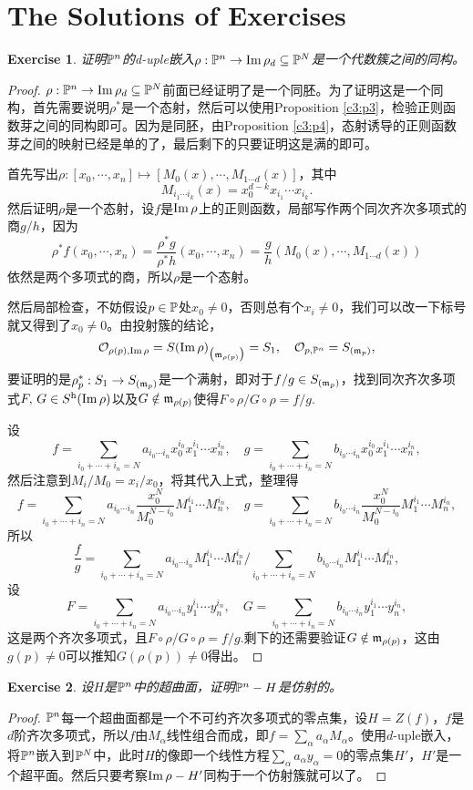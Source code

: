 \documentclass[9pt]{extarticle}
\theoremstyle{plain}%
\newtheorem{exe}{Exercise}[section]%
\begin{document}
\section*{The Solutions of Exercises}
\setcounter{exe}{3}
\begin{exe}
	证明$\mathbb{P}^n$的d-uple嵌入$\rho:\mathbb{P}^n\to \operatorname{Im} \rho_d\subseteq \mathbb{P}^N$是一个代数簇之间的同构。
\end{exe}
\begin{proof}
	$\rho:\mathbb{P}^n\to \operatorname{Im} \rho_d\subseteq \mathbb{P}^N$前面已经证明了是一个同胚。为了证明这是一个同构，首先需要说明$\rho^*$是一个态射，然后可以使用Proposition \ref{c3:p3}，检验正则函数芽之间的同构即可。因为是同胚，由Proposition \ref{c3:p4}，态射诱导的正则函数芽之间的映射已经是单的了，最后剩下的只要证明这是满的即可。

	首先写出$\rho:[x_0,\cdots,x_n]\mapsto [M_0(x),\cdots,M_{1\cdots d}(x)]$，其中
	\[
		M_{i_1\cdots i_k}(x)=x_0^{d-k}x_{i_1}\cdots x_{i_k}.
	\]
	然后证明$\rho$是一个态射，设$f$是$\operatorname{Im} \rho$上的正则函数，局部写作两个同次齐次多项式的商$g/h$，因为
	\[
		\rho^*f(x_0,\cdots,x_n)=\frac{\rho^*g}{\rho^*h}(x_0,\cdots,x_n)=\frac{g}{h}(M_0(x),\cdots,M_{1\cdots d}(x))
	\]
	依然是两个多项式的商，所以$\rho$是一个态射。

	然后局部检查，不妨假设$p\in \mathbb{P}$处$x_0\neq 0$，否则总有个$x_i\neq 0$，我们可以改一下标号就又得到了$x_0\neq 0$。由投射簇的结论，
	\[
		\mathcal{O}_{\rho(p),\operatorname{Im}\rho}=S(\operatorname{Im}\rho)_{\bigl(\mathfrak{m}_{\rho(p)}\bigr)}=S_1, \quad \mathcal{O}_{p,\mathbb{P}^n}=S_{(\mathfrak{m}_{p})},
	\]
	要证明的是$\rho^*_p:S_1\to S_{(\mathfrak{m}_{p})}$是一个满射，即对于$f/g\in S_{(\mathfrak{m}_{p})}$，找到同次齐次多项式$F,\,G\in S^{\mathrm{h}}(\operatorname{Im}\rho)$以及$G\notin \mathfrak{m}_{\rho(p)}$使得$F\circ \rho/G\circ \rho=f/g$.

	设
	\[
		f=\sum_{i_0+\cdots +i_n=N} a_{i_0\cdots i_n} x_0^{i_0}x_1^{i_1}\cdots x_n^{i_n},\quad g=\sum_{i_0+\cdots +i_n=N} b_{i_0\cdots i_n} x_0^{i_0}x_1^{i_1}\cdots x_n^{i_n},
	\]
	然后注意到$M_i/M_0=x_i/x_0$，将其代入上式，整理得
	\[
		f=\sum_{i_0+\cdots +i_n=N} a_{i_0\cdots i_n} \frac{x_0^N}{M_0^{N-i_0}}M_1^{i_1}\cdots M_n^{i_n},\quad g=\sum_{i_0+\cdots +i_n=N} b_{i_0\cdots i_n} \frac{x_0^N}{M_0^{N-i_0}}M_1^{i_1}\cdots M_n^{i_n},
	\]
	所以
	\[
		\frac{f}{g}=\sum_{i_0+\cdots +i_n=N} a_{i_0\cdots i_n} M_1^{i_1}\cdots M_n^{i_n}\Bigg/\sum_{i_0+\cdots +i_n=N} b_{i_0\cdots i_n} M_1^{i_1}\cdots M_n^{i_n},
	\]
	设
	\[
		F=\sum_{i_0+\cdots +i_n=N} a_{i_0\cdots i_n} y_1^{i_1}\cdots y_n^{i_n},\quad G=\sum_{i_0+\cdots +i_n=N} b_{i_0\cdots i_n} y_1^{i_1}\cdots y_n^{i_n},
	\]
	这是两个齐次多项式，且$F\circ \rho/G\circ \rho=f/g$.剩下的还需要验证$G\notin \mathfrak{m}_{\rho(p)}$，这由$g(p)\neq 0$可以推知$G(\rho(p))\neq 0$得出。
\end{proof}
\begin{exe}
	设$H$是$\mathbb{P}^n$中的超曲面，证明$\mathbb{P}^n-H$是仿射的。
\end{exe}
\begin{proof}
	$\mathbb{P}^n$每一个超曲面都是一个不可约齐次多项式的零点集，设$H=Z(f)$，$f$是$d$阶齐次多项式，所以$f$由$M_\alpha$线性组合而成，即$f=\sum_\alpha a_\alpha M_\alpha$。使用$d$-uple嵌入，将$\mathbb{P}^n$嵌入到$\mathbb{P}^N$中，此时$H$的像即一个线性方程$\sum_\alpha a_\alpha y_\alpha=0$的零点集$H'$，$H'$是一个超平面。然后只要考察$\operatorname{Im} \rho-H'$同构于一个仿射簇就可以了。
\end{proof}
\end{document}
